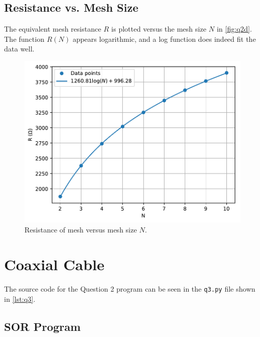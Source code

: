 \documentclass[a4paper,titlepage]{article}
\begin{document}
	\subsection{Resistance vs. Mesh Size}
	
	The equivalent mesh resistance $R$ is plotted versus the mesh size $N$ in \autoref{fig:q2d}. The function $R(N)$ appears logarithmic, and a log function does indeed fit the data well.
	
	\begin{figure}[!htb]
		\centering
		\includegraphics[width=\columnwidth]{plots/q2d.pdf}
		\caption
		{Resistance of mesh versus mesh size $N$.}
		\label{fig:q2d}
	\end{figure}
	
	\section{Coaxial Cable}
	
	The source code for the Question 2 program can be seen in the \texttt{q3.py} file shown in \autoref{lst:q3}.
	
	\subsection{SOR Program}
	
\end{document}
